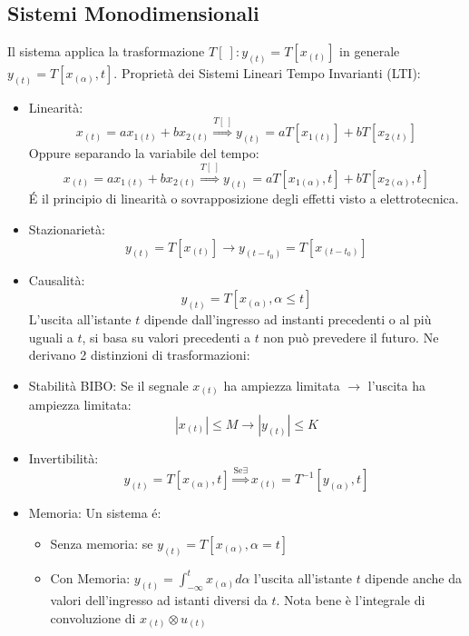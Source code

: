     \subsection{Sistemi Monodimensionali}
        Il sistema applica la trasformazione $T[\ ]: y_{(t)} = T[x_{(t)}]$ in generale \\ $y_{(t)} = T[x_{(\alpha)},t]$. 
        Proprietà dei Sistemi Lineari Tempo Invarianti (LTI):
        \begin{itemize}
            \item {Linearità:
                \[
                    x_{(t)} = ax_{1(t)}+bx_{2(t)} \overset{T[\ ]}{\Rightarrow} y_{(t)} = aT[x_{1(t)}]+b T[x_{2(t)}]
                \]
                Oppure separando la variabile del tempo:
                \[
                    x_{(t)} = ax_{1(t)}+bx_{2(t)} \overset{T[\ ]}{\Rightarrow} y_{(t)} = aT[x_{1(\alpha)},t]+b T[x_{2(\alpha)},t]
                \]
                É il principio di linearità o sovrapposizione degli effetti visto a elettrotecnica.
            }
            \item {Stazionarietà:
                \[
                    y_{(t)} = T[x_{(t)}] \rightarrow y_{(t-t_0)} = T[x_{(t-t_0)}]  
                \]
            }
            \item {Causalità:
                \[
                    y_{(t)} = T[x_{(\alpha)},\alpha\leq t]
                \]
                L'uscita all'istante $t$ dipende dall'ingresso ad instanti precedenti o al più uguali a $t$, si basa su valori precedenti a 
                $t$ non può prevedere il futuro. Ne derivano 2 distinzioni di trasformazioni:
            }
            \item {Stabilità BIBO:
                Se il segnale $x_{(t)}$ ha ampiezza limitata $\rightarrow$ l'uscita ha ampiezza limitata:
                    \[
                        |x_{(t)}|\leq M \rightarrow |y_{(t)}|\leq K 
                    \]
            }
            \item {Invertibilità:
                \[
                    y_{(t)} = T[x_{(\alpha)},t] \overset{\text{Se} \exists}{\Rightarrow} x_{(t)} = T^{-1}[y_{(\alpha)},t]
                \]
            }
            \item {Memoria:
                Un sistema é:
                \begin{itemize}
                    \item {Senza memoria: se $y_{(t)} = T[x_{(\alpha)},\alpha=t]$}
                    \item {Con Memoria: $y_{(t)} =\int_{-\infty}^{t}x_{(\alpha)} d\alpha$ l'uscita all'istante $t$ dipende anche da valori dell'ingresso 
                          ad istanti diversi da $t$. Nota bene è l'integrale di convoluzione di $x_{(t)} \otimes u_{(t)}$ 
                    }
                \end{itemize}
            }
        \end{itemize}
